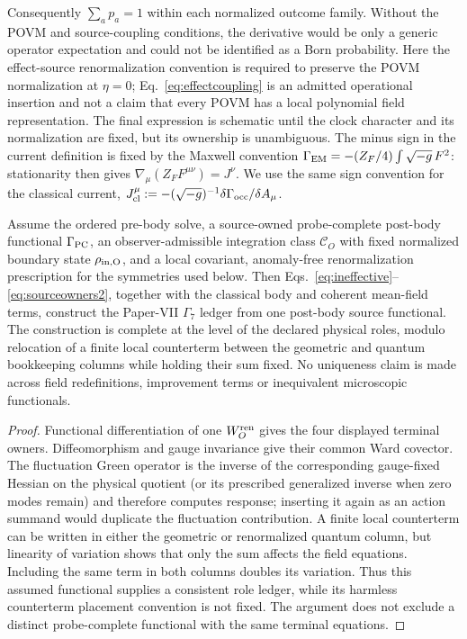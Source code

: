 Consequently $\sum_a p_a=1$ within each normalized outcome family.  Without
the POVM and source-coupling conditions, the derivative would be only a
generic operator expectation and could not be identified as a Born
probability.
Here the effect-source renormalization convention is required to preserve the
POVM normalization at $\eta=0$; Eq.~\eqref{eq:effectcoupling} is an admitted
operational insertion and not a claim that every POVM has a local polynomial
field representation.
The final expression is schematic until the clock character and its
normalization are fixed, but its ownership is unambiguous.
The minus sign in the current definition is fixed by the Maxwell convention
$\Gamma_{\rm EM}=-(Z_F/4)\int\sqrt{-g}\,F^2$: stationarity then gives
$\nabla_\mu(Z_FF^{\mu\nu})=J^\nu$.  We use the same sign convention for the
classical current,
$J_{\rm cl}^\mu:=-(\sqrt{-g})^{-1}\delta\Gamma_{\rm occ}/\delta A_\mu$.

\begin{theorem}
\label{thm:effectivesource}
Assume the ordered pre-body solve, a source-owned probe-complete post-body
functional $\Gamma_{\rm PC}$, an observer-admissible integration class
$\mathcal C_O$ with fixed normalized boundary state
$\rho_{\rm in,O}$, and a local covariant, anomaly-free renormalization
prescription for the symmetries used below.  Then
Eqs.~\eqref{eq:ineffective}--\eqref{eq:sourceowners2}, together with the
classical body and coherent mean-field terms, construct the Paper-VII
$\Gamma_7$ ledger from one post-body source functional.  The construction is
complete at the level of the declared physical roles, modulo relocation of a
finite local counterterm between the geometric and quantum bookkeeping
columns while holding their sum fixed.  No uniqueness claim is made across
field redefinitions, improvement terms or inequivalent microscopic
functionals.
\end{theorem}
\begin{proof}
Functional differentiation of one $W_O^{\rm ren}$ gives the four displayed
terminal owners.  Diffeomorphism and gauge invariance give their common Ward
covector.  The fluctuation Green operator is the inverse of the corresponding
gauge-fixed Hessian on the physical quotient (or its prescribed generalized
inverse when zero modes remain) and therefore computes response; inserting it again as an
action summand would duplicate the fluctuation contribution.  A finite local
counterterm can be written in either the geometric or renormalized quantum
column, but linearity of variation shows that only the sum affects the field
equations.  Including the same term in both columns doubles its variation.
Thus this assumed functional supplies a consistent role ledger, while its
harmless counterterm placement convention is not fixed.  The argument does
not exclude a distinct probe-complete functional with the same terminal
equations.
\end{proof}

